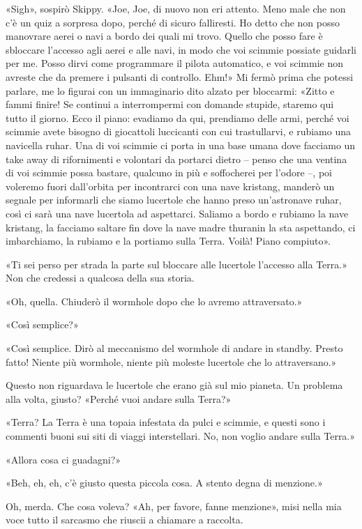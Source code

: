 «Sigh», sospirò Skippy. «Joe, Joe, di nuovo non eri attento. Meno male
che non c'è un quiz a sorpresa dopo, perché di sicuro falliresti. Ho
detto che non posso manovrare aerei o navi a bordo dei quali mi trovo.
Quello che posso fare è sbloccare l'accesso agli aerei e alle navi, in
modo che voi scimmie possiate guidarli per me. Posso dirvi come
programmare il pilota automatico, e voi scimmie non avreste che da
premere i pulsanti di controllo. Ehm!» Mi fermò prima che potessi
parlare, me lo figurai con un immaginario dito alzato per bloccarmi:
«Zitto e fammi finire! Se continui a interrompermi con domande stupide,
staremo qui tutto il giorno. Ecco il piano: evadiamo da qui, prendiamo
delle armi, perché voi scimmie avete bisogno di giocattoli luccicanti
con cui trastullarvi, e rubiamo una navicella ruhar. Una di voi scimmie
ci porta in una base umana dove facciamo un take away di rifornimenti e
volontari da portarci dietro -- penso che una ventina di voi scimmie
possa bastare, qualcuno in più e soffocherei per l'odore --, poi
voleremo fuori dall'orbita per incontrarci con una nave kristang,
manderò un segnale per informarli che siamo lucertole che hanno preso
un'astronave ruhar, così ci sarà una nave lucertola ad aspettarci.
Saliamo a bordo e rubiamo la nave kristang, la facciamo saltare fin dove
la nave madre thuranin la sta aspettando, ci imbarchiamo, la rubiamo e
la portiamo sulla Terra. Voilà! Piano compiuto».

«Ti sei perso per strada la parte sul bloccare alle lucertole l'accesso
alla Terra.» Non che credessi a qualcosa della sua storia.

«Oh, quella. Chiuderò il wormhole dopo che lo avremo attraversato.»

«Così semplice?»

«Così semplice. Dirò al meccanismo del wormhole di andare in standby.
Presto fatto! Niente più wormhole, niente più moleste lucertole che lo
attraversano.»

Questo non riguardava le lucertole che erano già sul mio pianeta. Un
problema alla volta, giusto? «Perché vuoi andare sulla Terra?»

«Terra? La Terra è una topaia infestata da pulci e scimmie, e questi
sono i commenti buoni sui siti di viaggi interstellari. No, non voglio
andare sulla Terra.»

«Allora cosa ci guadagni?»

«Beh, eh, eh, c'è giusto questa piccola cosa. A stento degna di
menzione.»

Oh, merda. Che cosa voleva? «Ah, per favore, fanne menzione», misi nella
mia voce tutto il sarcasmo che riuscii a chiamare a raccolta.

